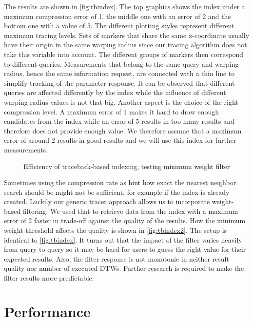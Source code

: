 The results are shown in \autoref{fig:tbindex}. The top graphics shows the index under a maximum compression error of \num{1}, the middle one with an error of \num{2} and the bottom one with a value of \num{5}. The different plotting styles represent different maximum tracing levels. Sets of markers that share the same x-coordinate usually have their origin in the same warping radius since our tracing algorithm does not take this variable into account. The different groups of markers then correspond to different queries. Measurements that belong to the same query and warping radius, hence the same information request, are connected with a thin line to simplify tracking of the parameter response. It can be observed that different queries are affected differently by the index while the influence of different warping radius values is not that big. Another aspect is the choice of the right compression level. A maximum error of \num{1} makes it hard to draw enough candidates from the index while an error of \num{5} results in too many results and therefore does not provide enough value. We therefore assume that a maximum error of around \num{2} results in good results and we will use this index for further measurements.

\begin{figure}
    \centering
    
    \caption{Efficiency of traceback-based indexing, testing minimum weight filter}\label{fig:tbindex2}
\end{figure}

Sometimes using the compression rate as hint how exact the nearest neighbor search should be might not be sufficient, for example if the index is already created. Luckily our generic tracer approach allows us to incorporate weight-based filtering. We used that to retrieve data from the index with a maximum error of \num{2} faster in trade-off against the quality of the results. How the minimum weight threshold affects the quality is shown in \autoref{fig:tbindex2}. The setup is identical to \autoref{fig:tbindex}. It turns out that the impact of the filter varies heavily from query to query so it may be hard for users to guess the right value for their expected results. Also, the filter response is not monotonic in neither result quality nor number of executed DTWs. Further research is required to make the filter results more predictable.



\section{Performance}
\label{sec:evaluation:perf}

